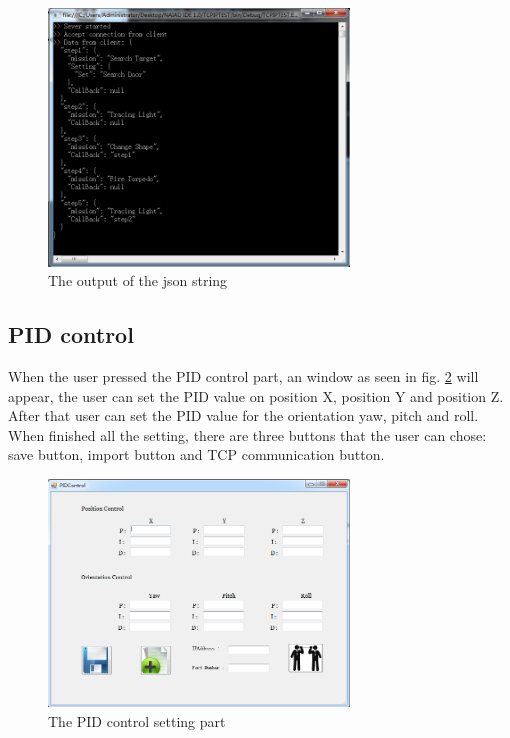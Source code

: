 \begin{figure}[!ht]
	\begin{center}
		\includegraphics[width=80mm]{./Images/Software/Json_string_result.png}
		\caption{The output of the json string}
		\label{IDE_overall_design3}
	\end{center}
\end{figure}

\subsection{PID control}
When the user pressed the PID control part, an window as seen in fig. \ref{IDE_overall_design4} will appear, the user can set the PID value on position X, position Y and position Z. After that user can set the PID value for the orientation yaw, pitch and roll. When finished all the setting, there are three buttons that the user can chose: save button, import button and TCP communication button.
\begin{figure}[!ht]
	\begin{center}
		\includegraphics[width=80mm]{./Images/Software/PIDcontrol_part.png}
		\caption{The PID control setting part}
		\label{IDE_overall_design4}
	\end{center}
\end{figure}

